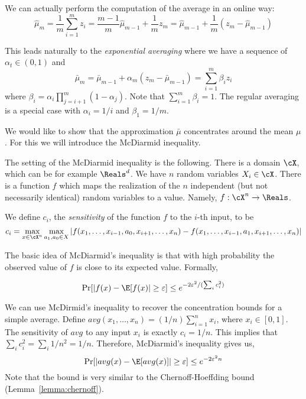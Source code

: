 We can actually perform the computation of the average in an online way:
\[
\widehat{\mu}_m=\frac{1}{m}\sum_{i=1}^m
z_i=\frac{m-1}{m}\widehat{\mu}_{m-1}+\frac{1}{m}z_m=\widehat{\mu}_{m-1}+\frac{1}{m}(z_m-\widehat{\mu}_{m-1})
\]

This leads naturally to the {\em exponential averaging} where we have
a sequence of $\alpha_t \in(0,1)$ and
\[
\bar{\mu}_m=\bar{\mu}_{m-1}+\alpha_m(z_m-\bar{\mu}_{m-1})=\sum_{i=1}^m
\beta_i z_i
\]
where $\beta_i=\alpha_i\prod_{j=i+1}^{m}(1-\alpha_j)$. Note that $\sum_{i=1}^m \beta_i=1$. The regular averaging is a special case with $\alpha_i=1/i$ and $\beta_1=1/m$.

We would like to show that the approximation $\bar{\mu}$
concentrates around the mean $\mu$. For this we will introduce the
McDiarmid inequality.

The setting of the McDiarmid inequality is the following. There is a
domain $\cX$, which can be for example $\Reals^d$. We have $n$
random variables $X_i \in \cX$. There is a function $f$ which maps
the realization of the $n$ independent (but not necessarily
identical) random variables to a value. Namely, $f:\cX^n \rightarrow
\Reals$.

We define $c_i$, the \emph{sensitivity}  of the function $f$ to the $i$-th
input, to be
$$
c_i =\max_{x\in \cX^n} \max_{a_1,a_0\in X} |f(x_1,
\ldots,x_{i-1},a_0,x_{i+1},\ldots, x_n)-f(x_1,
\ldots,x_{i-1},a_1,x_{i+1},\ldots, x_n)|
$$


The basic idea of McDiarmid's inequality is that with high probability
the observed value of $f$ is close to its expected value. Formally,
\begin{lemma}
\label{lemma:McDiarmid}
\[
\Pr[|f(x)-\E[f(x)|\geq \varepsilon]\leq e^{-2\varepsilon^2/(\sum_i
c_i^2)}
\]
\end{lemma}

We can use McDirmid's inequality to recover the concentration bounds
for a simple average. Define $avg(x_1, \ldots ,
x_n)=(1/n)\sum_{i=1}^n x_i$, where $x_i\in[0,1]$. The sensitivity of
$avg$ to any input $x_i$ is exactly $c_i=1/n$. This implies that
$\sum_i c_i^2=\sum_i 1/n^2=1/n$. Therefore, McDiarmid's inequality
gives us,
\[
\Pr[|avg(x)-\E[avg(x)]|\geq \varepsilon]\leq e^{-2\varepsilon^2n}
\]
Note that the bound is very similar to the Chernoff-Hoeffding bound
(Lemma~\ref{lemma:chernoff}).

